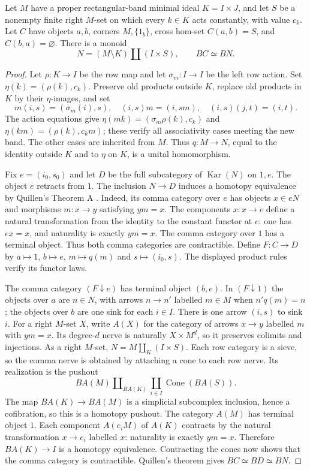 \begin{lemma}
\label{A:band-action-compression}
Let $M$ have a proper rectangular-band minimal ideal $K=I\times J$,
and let $S$ be a nonempty finite right $M$-set on which every $k\in K$
acts constantly, with value $c_k$. Let $C$ have objects $a,b$, corners
$M,\{1_b\}$, cross hom-set $C(a,b)=S$, and $C(b,a)=\varnothing$.
There is a monoid
\[
 N=(M\setminus K)\amalg(I\times S),\qquad BC\simeq BN.
\]
\end{lemma}
\begin{proof}
Let $\rho:K\to I$ be the row map and let $\sigma_m:I\to I$ be the
left row action. Set $\eta(k)=(\rho(k),c_k)$. Preserve old products
outside $K$, replace old products in $K$ by their $\eta$-images, and set
\[
m(i,s)=(\sigma_m(i),s),\quad (i,s)m=(i,sm),\quad
(i,s)(j,t)=(i,t).
\]
The action equations give
$\eta(mk)=(\sigma_m\rho(k),c_k)$ and
$\eta(km)=(\rho(k),c_km)$; these verify all associativity cases
meeting the new band. The other cases are inherited from $M$. Thus
$q:M\to N$, equal to the identity outside $K$ and to $\eta$ on $K$,
is a unital homomorphism.

Fix $e=(i_0,s_0)$ and let $D$ be the full subcategory of
$\operatorname{Kar}(N)$ on $1,e$. The object $e$ retracts from $1$.
The inclusion $N\to D$ induces a homotopy equivalence by
Quillen's Theorem A \cite[\S1, Theorem~A]{CP2-Quillen1973}.
Indeed, its comma category over $e$ has objects $x\in eN$ and
morphisms $m:x\to y$ satisfying $ym=x$. The components
$x:x\to e$ define a natural transformation from the identity to
the constant functor at $e$: one has $ex=x$, and naturality is
exactly $ym=x$. The comma category over $1$ has a terminal object.
Thus both comma categories are contractible. Define $F:C\to D$ by
$a\mapsto1$, $b\mapsto e$, $m\mapsto q(m)$ and
$s\mapsto(i_0,s)$. The displayed product rules verify its functor laws.

The comma category $(F\downarrow e)$ has terminal object $(b,e)$.
In $(F\downarrow1)$ the objects over $a$ are $n\in N$, with arrows
$n\to n'$ labelled $m\in M$ when $n'q(m)=n$; the objects over $b$
are one sink for each $i\in I$. There is one arrow $(i,s)$ to sink $i$.
For a right $M$-set $X$, write $A(X)$ for the category of arrows
$x\to y$ labelled $m$ with $ym=x$. Its degree-$d$ nerve is naturally
$X\times M^d$, so it preserves colimits and injections. As a right
$M$-set, $N=M\amalg_K(I\times S)$. Each row category is a sieve,
so the comma nerve is obtained by attaching a cone to each row nerve.
Its realization is the pushout
\[
 BA(M)\amalg_{BA(K)}\coprod_{i\in I}\operatorname{Cone}(BA(S)).
\]
The map $BA(K)\to BA(M)$ is a simplicial subcomplex inclusion, hence
a cofibration, so this is a homotopy pushout. The category $A(M)$ has
terminal object $1$. Each component $A(e_iM)$ of $A(K)$ contracts by
the natural transformation $x\to e_i$ labelled $x$: naturality is
exactly $ym=x$. Therefore $BA(K)\to I$ is a homotopy equivalence.
Contracting the cones now shows that the comma category is contractible.
Quillen's theorem gives $BC\simeq BD\simeq BN$.
\end{proof}

